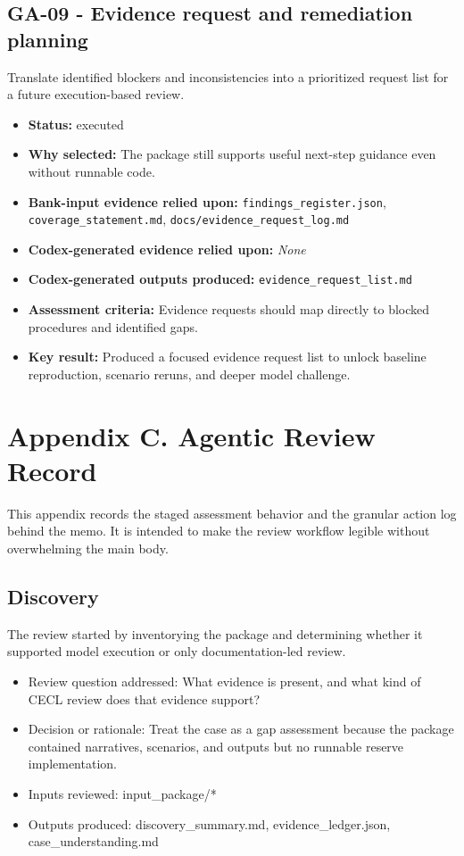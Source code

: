 \documentclass[11pt]{article}
\begin{document}
\subsection*{GA-09 - Evidence request and remediation planning}
Translate identified blockers and inconsistencies into a prioritized request list for a future execution-based review.
\begin{itemize}
\item \textbf{Status:} executed
\item \textbf{Why selected:} The package still supports useful next-step guidance even without runnable code.
\item \textbf{Bank-input evidence relied upon:} \texttt{findings\_register.json}, \texttt{coverage\_statement.md}, \texttt{docs/evidence\_request\_log.md}
\item \textbf{Codex-generated evidence relied upon:} \textit{None}
\item \textbf{Codex-generated outputs produced:} \texttt{evidence\_request\_list.md}
\item \textbf{Assessment criteria:} Evidence requests should map directly to blocked procedures and identified gaps.
\item \textbf{Key result:} Produced a focused evidence request list to unlock baseline reproduction, scenario reruns, and deeper model challenge.
\end{itemize}
\section*{Appendix C. Agentic Review Record}
This appendix records the staged assessment behavior and the granular action log behind the memo. It is intended to make the review workflow legible without overwhelming the main body.
\subsection*{Discovery}
The review started by inventorying the package and determining whether it supported model execution or only documentation-led review.
\begin{itemize}
\item Review question addressed: What evidence is present, and what kind of CECL review does that evidence support?
\item Decision or rationale: Treat the case as a gap assessment because the package contained narratives, scenarios, and outputs but no runnable reserve implementation.
\item Inputs reviewed: input\_package/*
\item Outputs produced: discovery\_summary.md, evidence\_ledger.json, case\_understanding.md
\end{itemize}
\end{document}
